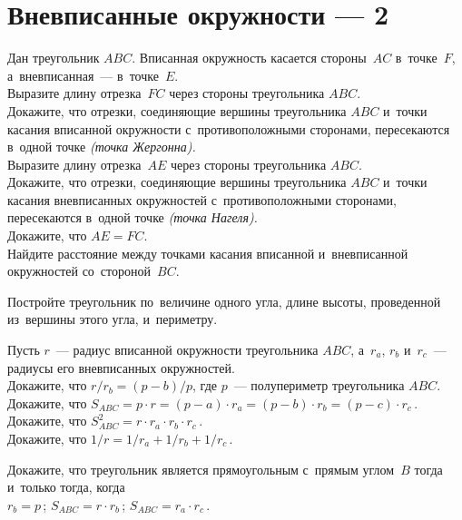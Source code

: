 
\section*{Вневписанные окружности --- 2}


\begin{problems}

\item
Дан треугольник $ABC$.
Вписанная окружность касается стороны~$AC$ в~точке~$F$, а~вневписанная~---
в~точке~$E$.
\\
\subproblem
Выразите длину отрезка~$FC$ через стороны треугольника $ABC$.
\\
\subproblem
Докажите, что отрезки, соединяющие вершины треугольника $ABC$ и~точки касания
вписанной окружности с~противоположными сторонами, пересекаются в~одной точке
\emph{(точка Жергонна).}
\\
\subproblem
Выразите длину отрезка~$AE$ через стороны треугольника $ABC$.
\\
\subproblem
Докажите, что отрезки, соединяющие вершины треугольника $ABC$ и~точки касания
вневписанных окружностей с~противоположными сторонами, пересекаются в~одной
точке \emph{(точка Нагеля).}
\\
\subproblem
Докажите, что $AE = FC$.
\\
\subproblem
Найдите расстояние между точками касания вписанной и~вневписанной окружностей
со~стороной~$BC$.

\item
Постройте треугольник по~величине одного угла, длине высоты, проведенной
из~вершины этого угла, и~периметру.

\item
Пусть $r$~--- радиус вписанной окружности треугольника $ABC$,
а~$r_a$, $r_b$ и~$r_c$~--- радиусы его вневписанных окружностей.
\\
\subproblem
Докажите, что $r / r_{b} = (p - b) / p$, где $p$~--- полупериметр
треугольника $ABC$.
\\
\subproblem
Докажите, что
\(
    S_{ABC}
=
    p \cdot r
=
    (p - a) \cdot r_{a}
=
    (p - b) \cdot r_{b}
=
    (p - c) \cdot r_{c}
\)\,.
\\
\subproblem
Докажите, что $S_{ABC}^2 = r \cdot r_{a} \cdot r_{b} \cdot r_{c}$\,.
\\
\subproblem
Докажите, что $1 / r = 1 / r_{a} + 1 / r_{b} + 1 / r_{c}$\,.

\item
Докажите, что треугольник является прямоугольным с~прямым углом~$B$ тогда
и~только тогда, когда
\\
\subproblem $r_{b} = p$\,;
\qquad
\subproblem $S_{ABC} = r \cdot r_{b}$\,;
\qquad
\subproblem $S_{ABC} = r_{a} \cdot r_{c}$\,.

\end{problems}

